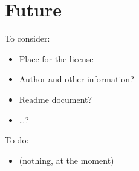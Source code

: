 \documentclass{article}
\begin{document}
\newpage
\section{Future}

To consider:
\begin{itemize}
\item Place for the license
\item Author and other information?
\item Readme document?
\item \ldots?
\end{itemize}

To do:
\begin{itemize}
\item (nothing, at the moment)
\end{itemize}
\end{document}
